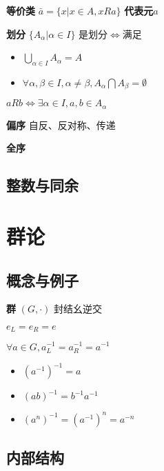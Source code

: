\documentclass[a4paper,10pt]{ctexart}
\renewcommand*{\iff}{\Leftrightarrow}
\begin{document}
\begin{multicols}{3}
    \textbf{等价类} $\bar{a} = \{ x | x \in A, xRa \}$ \textbf{代表元}$a$

    \textbf{划分} $\{ A_\alpha | \alpha \in I \}$ 是划分$\iff$满足

    \begin{itemize}
        \item $\bigcup\limits_{\alpha \in I} A_\alpha = A$
        \item $\forall \alpha, \beta \in I, \alpha \ne \beta, A_\alpha \bigcap A_\beta = \emptyset$
    \end{itemize}

    \begin{theorem}[等价与划分]
        $aRb \iff \exists \alpha \in I, a, b \in A_\alpha$
    \end{theorem}

    \textbf{偏序} 自反、反对称、传递

    \textbf{全序}

    \subsection{整数与同余}

    \section{群论}

    \subsection{概念与例子}

    \textbf{群} $(G, \cdot)$ 封结幺逆交

    \begin{theorem}[幺元性质]
        $e_L = e_R = e$
    \end{theorem}

    \begin{theorem}[逆元性质]
        $\forall a \in G, a_L^{-1} = a_R^{-1} = a^{-1}$

        \begin{itemize}
            \item $(a^{-1})^{-1} = a$
            \item $(ab)^{-1}=b^{-1}a^{-1}$
            \item $(a^n)^{-1}=(a^{-1})^n=a^{-n}$
        \end{itemize}
    \end{theorem}

    \subsection{内部结构}


\end{multicols}
\end{document}
